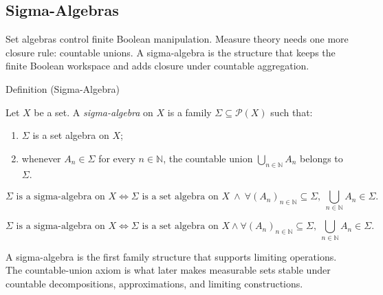 
\subsection{Sigma-Algebras}

\begin{exposition}
Set algebras control finite Boolean manipulation.  Measure theory needs one
more closure rule: countable unions.  A sigma-algebra is the structure that
keeps the finite Boolean workspace and adds closure under countable
aggregation.
\end{exposition}

\begin{definitionbox}{Definition (Sigma-Algebra)}
\begin{definition}\label{def:sigma-algebra}
Let \(X\) be a set.  A \emph{sigma-algebra} on \(X\) is a family
\(\Sigma\subseteq\mathcal P(X)\) such that:
\begin{enumerate}[label=(\roman*)]
\item \(\Sigma\) is a set algebra on \(X\);
\item whenever \(A_n\in\Sigma\) for every \(n\in\mathbb N\), the countable
      union \(\bigcup_{n\in\mathbb N}A_n\) belongs to \(\Sigma\).
\end{enumerate}
\end{definition}
\end{definitionbox}

\begin{remark*}
\[
\Sigma\text{ is a sigma-algebra on }X
\iff
\Sigma\text{ is a set algebra on }X
\ \wedge\
\forall (A_n)_{n\in\mathbb N}\subseteq\Sigma,\ 
\bigcup_{n\in\mathbb N}A_n\in\Sigma.
\]
\end{remark*}

\begin{remark*}
\[
  \Sigma\text{ is a sigma-algebra on }X
  \iff
  \Sigma\text{ is a set algebra on }X
  \wedge
  \forall (A_n)_{n\in\mathbb N}\subseteq\Sigma,\ 
  \bigcup_{n\in\mathbb N}A_n\in\Sigma.
\]
\end{remark*}

\begin{remark*}[Interpretation]
A sigma-algebra is the first family structure that supports limiting
operations.  The countable-union axiom is what later makes measurable sets
stable under countable decompositions, approximations, and limiting
constructions.
\end{remark*}

